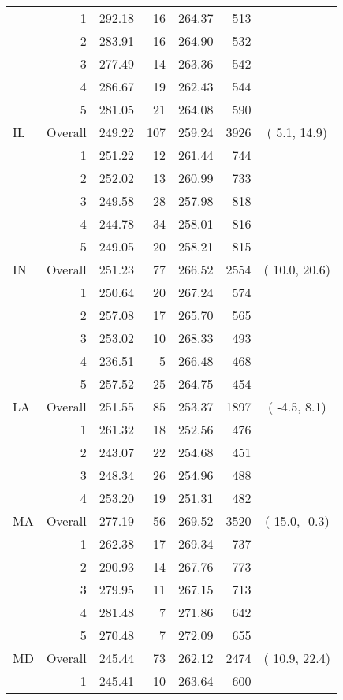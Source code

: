 \begin{longtable}{lrrr@{\extracolsep{.25cm}}rrc}
   & 1 & 292.18 &  16 & 264.37 & 513 &  \\ 
   & 2 & 283.91 &  16 & 264.90 & 532 &  \\ 
   & 3 & 277.49 &  14 & 263.36 & 542 &  \\ 
   & 4 & 286.67 &  19 & 262.43 & 544 &  \\ 
   & 5 & 281.05 &  21 & 264.08 & 590 &  \\ 
   \hline
IL & Overall & 249.22 & 107 & 259.24 & 3926 & (  5.1,  14.9) \\ 
   & 1 & 251.22 &  12 & 261.44 & 744 &  \\ 
   & 2 & 252.02 &  13 & 260.99 & 733 &  \\ 
   & 3 & 249.58 &  28 & 257.98 & 818 &  \\ 
   & 4 & 244.78 &  34 & 258.01 & 816 &  \\ 
   & 5 & 249.05 &  20 & 258.21 & 815 &  \\ 
   \hline
IN & Overall & 251.23 &  77 & 266.52 & 2554 & ( 10.0,  20.6) \\ 
   & 1 & 250.64 &  20 & 267.24 & 574 &  \\ 
   & 2 & 257.08 &  17 & 265.70 & 565 &  \\ 
   & 3 & 253.02 &  10 & 268.33 & 493 &  \\ 
   & 4 & 236.51 &   5 & 266.48 & 468 &  \\ 
   & 5 & 257.52 &  25 & 264.75 & 454 &  \\ 
   \hline
LA & Overall & 251.55 &  85 & 253.37 & 1897 & ( -4.5,   8.1) \\ 
   & 1 & 261.32 &  18 & 252.56 & 476 &  \\ 
   & 2 & 243.07 &  22 & 254.68 & 451 &  \\ 
   & 3 & 248.34 &  26 & 254.96 & 488 &  \\ 
   & 4 & 253.20 &  19 & 251.31 & 482 &  \\ 
   \hline
MA & Overall & 277.19 &  56 & 269.52 & 3520 & (-15.0,  -0.3) \\ 
   & 1 & 262.38 &  17 & 269.34 & 737 &  \\ 
   & 2 & 290.93 &  14 & 267.76 & 773 &  \\ 
   & 3 & 279.95 &  11 & 267.15 & 713 &  \\ 
   & 4 & 281.48 &   7 & 271.86 & 642 &  \\ 
   & 5 & 270.48 &   7 & 272.09 & 655 &  \\ 
   \hline
MD & Overall & 245.44 &  73 & 262.12 & 2474 & ( 10.9,  22.4) \\ 
   & 1 & 245.41 &  10 & 263.64 & 600 &  \\ 

\end{longtable}
